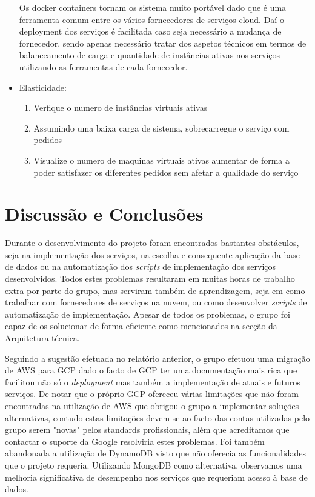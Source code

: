 \documentclass[11pt,a4paper]{article}
\begin{document}
\begin{itemize}
Os docker containers tornam os sistema muito portável dado que é uma ferramenta comum entre os vários fornecedores de serviços cloud. Daí o deployment dos serviços é facilitada caso seja necessário a mudança de fornecedor, sendo apenas necessário tratar dos aspetos técnicos em termos de balanceamento de carga e quantidade de instâncias ativas nos serviços utilizando as ferramentas de cada fornecedor.

	\item Elasticidade:
	\begin{enumerate}
		\item Verfique o numero de instâncias virtuais ativas
		\item Assumindo uma baixa carga de sistema, sobrecarregue o serviço com pedidos
		\item Visualize o numero de maquinas virtuais ativas aumentar de forma a poder satisfazer os diferentes pedidos sem afetar a qualidade do serviço
	\end{enumerate}
\end{itemize}

\section{Discussão e Conclusões}
Durante o desenvolvimento do projeto foram encontrados bastantes obstáculos, seja na implementação dos serviços, na escolha e consequente aplicação da base de dados ou na automatização dos \textit{scripts} de implementação dos serviços desenvolvidos. Todos estes problemas resultaram em muitas horas de trabalho extra por parte do grupo, mas serviram também de aprendizagem, seja em como trabalhar com fornecedores de serviços na nuvem, ou como desenvolver \textit{scripts} de automatização de implementação. Apesar de todos os problemas, o grupo foi capaz de os solucionar de forma eficiente como mencionados na secção da Arquitetura técnica.

Seguindo a sugestão efetuada no relatório anterior, o grupo efetuou uma migração de AWS para GCP dado o facto de GCP ter uma documentação mais rica que facilitou não só o \textit{deployment} mas também a implementação de atuais e futuros serviços. De notar que o próprio GCP ofereceu várias limitações que não foram encontradas na utilização de AWS que obrigou o grupo a implementar soluções alternativas, contudo estas limitações devem-se ao facto das contas utilizadas pelo grupo serem "novas" pelos standards profissionais, além que acreditamos que contactar o suporte da Google resolviria estes problemas. %
Foi também abandonada a utilização de DynamoDB visto que não oferecia as funcionalidades que o projeto requeria. Utilizando MongoDB como alternativa, observamos uma melhoria significativa de desempenho nos serviços que requeriam acesso à base de dados. 
\end{document}
